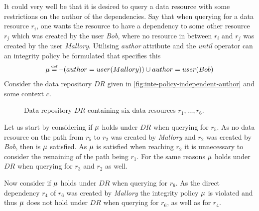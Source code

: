 \begin{example}
It could very well be that it is desired to query a data resource with some restrictions on the author of the dependencies. Say that when querying for a data resource $r_i$, one wants the resource to have a dependency to some other resource $r_j$ which was created by the user \emph{Bob}, where no resource in between $r_i$ and $r_j$ was created by the user \emph{Mallory}. Utilising \emph{author} attribute and the \emph{until} operator can an integrity policy be formulated that specifies this
\begin{align*}
    \inte \eqdef  \lnot (author = user(Mallory)) \U author = user(Bob)
\end{align*}
Consider the data repository $DR$ given in \autoref{fig:inte-policy-independent-author} and some context $c$.
\begin{figure}[!ht]
    \begin{center}
        
        \caption{Data repository $DR$ containing six data resources $r_1, \ldots, r_6$.}
        \label{fig:inte-policy-independent-author}
    \end{center}
\end{figure}
Let us start by considering if $\mu$ holds under $DR$ when querying for $r_5$. As no data resource on the path from $r_5$ to $r_2$ was created by \emph{Mallory} and $r_2$ was created by \emph{Bob}, then is $\mu$ satisfied. As $\mu$ is satisfied when reaching $r_2$ it is unnecessary to consider the remaining of the path being $r_1$. For the same reasons $\mu$ holds under $DR$ when querying for $r_3$ and $r_2$ as well.

Now consider if $\mu$ holds under $DR$ when querying for $r_6$. As the direct dependency $r_4$ of $r_6$ was created by \emph{Mallory} the integrity policy $\mu$ is violated and thus $\mu$ does not hold under $DR$ when querying for $r_6$, as well as for $r_4$.
\end{example}


